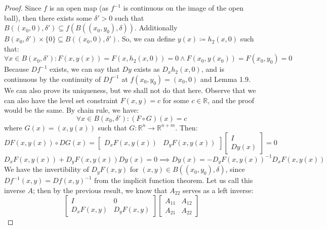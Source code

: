 \documentclass[10pt,letterpaper]{article} %
\begin{document}
\begin{proof}
Since $f$ is an open map (as $f^{-1}$ is continuous on the image of the open ball), then there exists some $\delta' > 0$ such that $B((x_0, 0), \delta') \subseteq f(B((x_0, y_0), \delta))$. Additionally $B(x_0, \delta') \times \{0\} \subseteq B((x_0, 0), \delta')$. So, we can define $y(x) \coloneq h_2(x, 0)$ such that:
\begin{equation*}
\forall x \in B(x_0, \delta'): F(x, y(x)) = F(x, h_2(x, 0)) = 0 \land F(x_0, y(x_0)) = F(x_0, y_0) = 0
\end{equation*}
Because $Df^{-1}$ exists, we can say that $Dy$ exists as $D_xh_2(x, 0)$, and is continuous by the continuity of $Df^{-1}$ at $f(x_0, y_0) = (x_0, 0)$ and Lemma 1.9. We can also prove its uniqueness, but we shall not do that here. Observe that we can also have the level set constraint $F(x, y) = c$ for some $c \in \mathbb{R}$, and the proof would be the same. By chain rule, we have:
\begin{equation*}
\forall x \in B(x_0, \delta'): (F \circ G)(x) = c
\end{equation*}
where $G(x) = (x, y(x))$ such that $G: \mathbb{R}^n \xrightarrow{} \mathbb{R}^{n+m}$. Then:
\begin{equation*}
DF(x, y(x)) \circ DG(x) = \begin{bmatrix}
D_xF(x, y(x)) & D_yF(x, y(x))
\end{bmatrix}\begin{bmatrix}
I\\Dy(x)
\end{bmatrix} = 0
\end{equation*}
\begin{equation*}
D_xF(x, y(x)) + D_yF(x, y(x))Dy(x) = 0 \implies Dy(x) = -D_yF(x, y(x))^{-1}D_xF(x, y(x))
\end{equation*}
We have the invertibility of $D_yF(x, y)$ for $(x, y) \in B((x_0, y_0), \delta)$, since $Df^{-1}(x, y) = Df(x, y)^{-1}$ from the implicit function theorem. Let us call this inverse $A$; then by the previous result, we know that $A_{22}$ serves as a left inverse:
\begin{equation*}
\begin{bmatrix}
I & 0\\
D_xF(x, y) & D_yF(x, y)
\end{bmatrix}\begin{bmatrix}
A_{11} & A_{12}\\A_{21} & A_{22}
\end{bmatrix}
\end{equation*}
\begin{equation*}

\end{equation*}
\end{proof}
\end{document}
